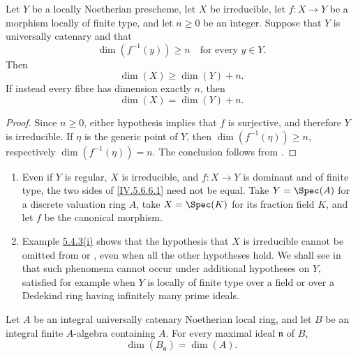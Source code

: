\begin{corollary}[5.6.8]
\label{IV.5.6.8}
Let $Y$ be a locally Noetherian prescheme, let $X$ be irreducible,
let $f:X\to Y$ be a morphism locally of finite type, and let
$n\geq0$ be an integer.  Suppose that $Y$ is universally catenary
and that
\[
\dim(f^{-1}(y))\geq n
\quad\text{for every }y\in Y.
\]
Then
\begin{equation}
\dim(X)\geq\dim(Y)+n.
\tag{5.6.8.1}\label{IV.5.6.8.1}
\end{equation}
If instead every fibre has dimension exactly $n$, then
\begin{equation}
\dim(X)=\dim(Y)+n.
\tag{5.6.8.2}\label{IV.5.6.8.2}
\end{equation}
\end{corollary}

\begin{proof}
Since $n\geq0$, either hypothesis implies that $f$ is surjective,
and therefore $Y$ is irreducible.  If $\eta$ is the generic point of
$Y$, then $\dim(f^{-1}(\eta))\geq n$, respectively
$\dim(f^{-1}(\eta))=n$.  The conclusion follows from
.
\end{proof}

\begin{remarks}[5.6.9]
\label{IV.5.6.9}
\begin{enumerate}[{\rm(i)}]
\item
{}
\label{IV.5.6.9.i}
Even if $Y$ is regular, $X$ is irreducible, and $f:X\to Y$ is
dominant and of finite type, the two sides of
\eqref{IV.5.6.6.1} need not be equal.  Take
$Y=\Spec(A)$ for a discrete valuation ring $A$, take
$X=\Spec(K)$ for its fraction field $K$, and let $f$ be the
canonical morphism.

\item
{}
\label{IV.5.6.9.ii}
Example {\hyperlink{ega4.c04.sec.5-4-3-i}{5.4.3\textup{(i)}}} shows that the
hypothesis that $X$ is
irreducible cannot be omitted from  or
, even when all the other hypotheses hold.  We shall
see in  that such phenomena cannot occur under
additional hypotheses on $Y$, satisfied for example when $Y$ is
locally of finite type over a field or over a Dedekind ring having
infinitely many prime ideals.
\end{enumerate}
\end{remarks}

\begin{proposition}[5.6.10]
\label{IV.5.6.10}
Let $A$ be an integral universally catenary Noetherian local ring,
and let $B$ be an integral finite $A$-algebra containing $A$.  For
every maximal ideal $\mathfrak n$ of $B$,
\[
\dim(B_{\mathfrak n})=\dim(A).
\]
\end{proposition}

